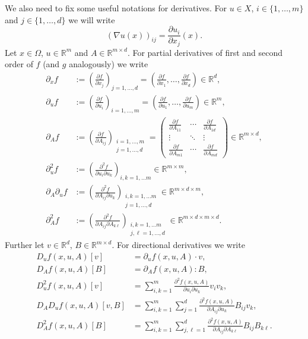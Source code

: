 We also need to fix some useful notations for derivatives. For $u\in X$, $i\in\{1,\dotsc,m\}$ and $j\in\{1,\dotsc,d\}$ we will write
\[(\nabla u(x))_{ij}=\frac{\partial u_i}{\partial x_j}(x).\]
Let $x\in\Omega$, $u\in\mathbb{R}^m$ and $A\in\mathbb{R}^{m\times d}$. For partial derivatives of first and second order of $f$ (and $g$ analogously) we write
\begin{align*}
	\partial_xf&:=\left(\frac{\partial f}{\partial x_j}\right)_{j=1,\dotsc,d}=\left(\frac{\partial f}{\partial x_1},\dotsc,\frac{\partial f}{\partial x_d}\right)\in\mathbb{R}^d,\\
	\partial_uf&:=\left(\frac{\partial f}{\partial u_i}\right)_{i=1,\dotsc,m}=\left(\frac{\partial f}{\partial u_1},\dotsc,\frac{\partial f}{\partial u_m}\right)\in\mathbb{R}^m,\\
	\partial_Af&:=\left(\frac{\partial f}{\partial A_{ij}}\right)_{\substack{i=1,\dotsc,m\\j=1,\dotsc,d}}=\begin{pmatrix}
		\frac{\partial f}{\partial A_{11}}&\cdots&\frac{\partial f}{\partial A_{1d}}\\
		\vdots&\ddots&\vdots\\
		\frac{\partial f}{\partial A_{m1}}&\cdots&\frac{\partial f}{\partial A_{md}}
	\end{pmatrix}\in\mathbb{R}^{m\times d},\\
	\partial_u^2f&:=\left(\frac{\partial^2f}{\partial u_i\partial u_k}\right)_{i,k=1,\dotsc m}\in\mathbb{R}^{m\times m},\\
	\partial_A\partial_uf&:=\left(\frac{\partial^2f}{\partial A_{ij}\partial u_k}\right)_{\substack{i,k=1,\dotsc m\\j=1,\dotsc,d}}\in\mathbb{R}^{m\times d\times m},\\
	\partial_A^2f&:=\left(\frac{\partial^2f}{\partial A_{ij}\partial A_{k\ell}}\right)_{\substack{i,k=1,\dotsc m\\j,\ell=1,\dotsc,d}}\in\mathbb{R}^{m\times d\times m\times d}.
\end{align*}
Further let $v\in\mathbb{R}^d$, $B\in\mathbb{R}^{m\times d}$. For directional derivatives we write
\begin{align*}
	D_uf(x,u,A)[v]&=\partial_uf(x,u,A)\cdot v,\\
	D_Af(x,u,A)[B]&=\partial_Af(x,u,A):B,\\
	D_u^2f(x,u,A)[v]&=\sum_{i,k=1}^m{\frac{\partial^2 f(x,u,A)}{\partial u_i\partial u_k}v_iv_k},\\
	D_AD_uf(x,u,A)[v,B]&=\sum_{i,k=1}^m{\sum_{j=1}^d{\frac{\partial^2 f(x,u,A)}{\partial A_{ij}\partial u_k}B_{ij}v_k}},\\
	D_A^2f(x,u,A)[B]&=\sum_{i,k=1}^m{\sum_{j,\ell=1}^d{\frac{\partial^2f(x,u,A)}{\partial A_{ij}\partial A_{k\ell}}B_{ij}B_{k\ell}}}.
\end{align*}
